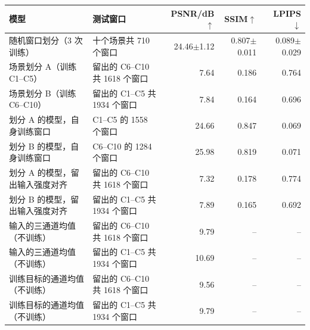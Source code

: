 \begin{tabular}{@{}llrrr@{}}
\toprule
模型 & 测试窗口 & PSNR/dB$\uparrow$ & SSIM$\uparrow$ & LPIPS$\downarrow$\\
\midrule
随机窗口划分（3 次训练） & 十个场景共 710 个窗口 & 24.46$\pm$1.12 & 0.807$\pm$0.011 & 0.089$\pm$0.029 \\
\midrule
场景划分 A（训练 C1--C5） & 留出的 C6--C10 共 1618 个窗口 & 7.64 & 0.186 & 0.764 \\
场景划分 B（训练 C6--C10） & 留出的 C1--C5 共 1934 个窗口 & 7.84 & 0.164 & 0.696 \\
\midrule
划分 A 的模型，自身训练窗口 & C1--C5 的 1558 个窗口 & 24.66 & 0.847 & 0.069 \\
划分 B 的模型，自身训练窗口 & C6--C10 的 1284 个窗口 & 25.98 & 0.819 & 0.071 \\
划分 A 的模型，留出输入强度对齐 & 留出的 C6--C10 共 1618 个窗口 & 7.32 & 0.178 & 0.774 \\
划分 B 的模型，留出输入强度对齐 & 留出的 C1--C5 共 1934 个窗口 & 7.89 & 0.165 & 0.692 \\
\midrule
输入的三通道均值（不训练） & 留出的 C6--C10 共 1618 个窗口 & 9.79 & -- & -- \\
输入的三通道均值（不训练） & 留出的 C1--C5 共 1934 个窗口 & 10.69 & -- & -- \\
训练目标的通道均值（不训练） & 留出的 C6--C10 共 1618 个窗口 & 9.56 & -- & -- \\
训练目标的通道均值（不训练） & 留出的 C1--C5 共 1934 个窗口 & 9.79 & -- & -- \\
\bottomrule
\end{tabular}
